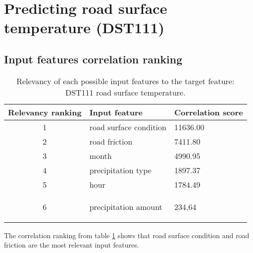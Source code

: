 \section{Predicting road surface temperature (DST111)}
	\subsection{Input features correlation ranking}

	\begin{table}[H]
		\centering
		\caption{Relevancy of each possible input features to the target feature: DST111 road surface temperature. }
		\begin{tabular}[3]{c | l | l }
    			Relevancy ranking & Input feature & Correlation score  \\
			 \hline
			1 & road surface condition & 11636.00 \\ \hline
			2 & road friction & 7411.80 \\ \hline
			3 & month & 4990.95 \\ \hline
			4 & precipitation type & 1897.37 \\ \hline
			5 & hour & 1784.49 \\ \hline
			6 & precipitation amount & 234,64 
 
			\label{table:feature_comparison_dst111}
		\end{tabular}
	\end{table}

	The correlation ranking from table \ref{table:feature_comparison_dst111} shows that road surface condition and road friction are the most relevant input features.

